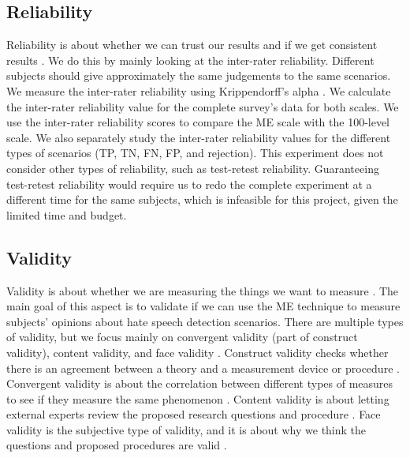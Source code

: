 \subsection{Reliability}
Reliability is about whether we can trust our results and if we get consistent results \cite{fitzner2007reliability}.
%
We do this by mainly looking at the inter-rater reliability.
%
Different subjects should give approximately the same judgements to the same scenarios.
%
We measure the inter-rater reliability using Krippendorff's alpha \cite{maddalena2017crowdsourcing, krippendorff2004reliability}.
%
We calculate the inter-rater reliability value for the complete survey's data for both scales.
%
We use the inter-rater reliability scores to compare the ME scale with the 100-level scale.
%
We also separately study the inter-rater reliability values for the different types of scenarios (TP, TN, FN, FP, and rejection).
%
This experiment does not consider other types of reliability, such as test-retest reliability.
%
Guaranteeing test-retest reliability would require us to redo the complete experiment at a different time for the same subjects, which is infeasible for this project, given the limited time and budget.

\subsection{Validity}
\label{sec:analysis-validity}
Validity is about whether we are measuring the things we want to measure \cite{fitzner2007reliability}. The main goal of this aspect is to validate if we can use the ME technique to measure subjects' opinions about hate speech detection scenarios. There are multiple types of validity, but we focus mainly on convergent validity (part of construct validity), content validity, and face validity \cite{fitzner2007reliability}. Construct validity checks whether there is an agreement between a theory and a measurement device or procedure \cite{fitzner2007reliability}. Convergent validity is about the correlation between different types of measures to see if they measure the same phenomenon \cite{fitzner2007reliability}. Content validity is about letting external experts review the proposed research questions and procedure \cite{fitzner2007reliability}. Face validity is the subjective type of validity, and it is about why we think the questions and proposed procedures are valid \cite{fitzner2007reliability}.

